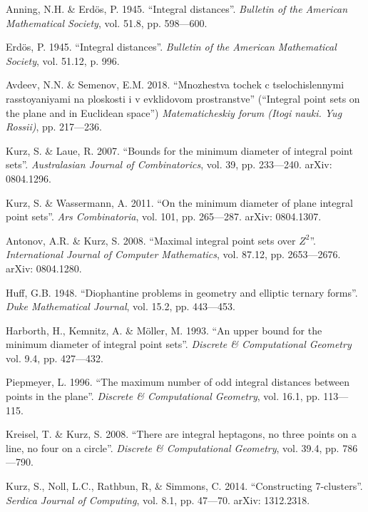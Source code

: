 \begin{engbibliography}{99}

	Anning, N.H. \& Erdös, P. 1945.
	“Integral distances”.
	\emph{Bulletin of the American Mathematical Society}, vol. 51.8, pp. 598—600.

	Erdös, P. 1945.
	“Integral distances”.
	\emph{Bulletin of the American Mathematical Society}, vol. 51.12, p. 996.

	Avdeev, N.N. \& Semenov, E.M. 2018.
	``Mnozhestva tochek c tselochislennymi rasstoyaniyami na ploskosti i v evklidovom prostranstve''
	(``Integral point sets on the plane and in Euclidean space'')
	\emph{Matematicheskiy forum (Itogi nauki. Yug Rossii)}, pp. 217—236.

	Kurz, S. \& Laue, R. 2007.
	“Bounds for the minimum diameter of integral point sets”.
	\emph{Australasian Journal of Combinatorics}, vol. 39, pp. 233—240. arXiv: 0804.1296.

	Kurz, S. \& Wassermann, A. 2011.
	“On the minimum diameter of plane integral point sets”.
	\emph{Ars Combinatoria}, vol. 101, pp. 265—287. arXiv: 0804.1307.

	Antonov, A.R. \& Kurz, S. 2008.
	“Maximal integral point sets over $Z^2$”.
	\emph{International Journal of Computer Mathematics}, vol. 87.12, pp. 2653—2676. arXiv: 0804.1280.

	Huff, G.B. 1948.
	“Diophantine problems in geometry and elliptic ternary forms”.
	\emph{Duke Mathematical Journal}, vol. 15.2, pp. 443—453.

	Harborth, H., Kemnitz, A. \& Möller, M. 1993.
	“An upper bound for the minimum diameter of integral point sets”.
	\emph{Discrete \& Computational Geometry} vol. 9.4, pp. 427—432.

	Piepmeyer, L. 1996.
	“The maximum number of odd integral distances between points in the plane”.
	\emph{Discrete \& Computational Geometry}, vol. 16.1, pp. 113—115.

	Kreisel, T. \& Kurz, S. 2008.
	“There are integral heptagons, no three points on a line, no four on a circle”.
	\emph{Discrete \& Computational Geometry}, vol. 39.4, pp. 786—790.

	Kurz, S., Noll, L.C., Rathbun, R, \& Simmons, C. 2014.
	“Constructing 7-clusters”.
	\emph{Serdica Journal of Computing}, vol. 8.1, pp. 47—70. arXiv: 1312.2318.


\end{engbibliography}
